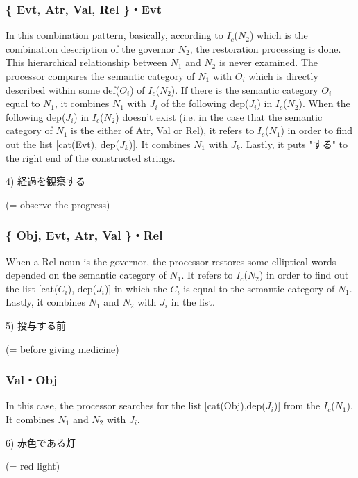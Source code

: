 \subsubsection{\{ Evt, Atr, Val, Rel \}・Evt}
 In this combination pattern, basically, according to $I_c$($N_2$)
which is the combination description of the governor $N_2$, the
restoration processing is done. This hierarchical relationship between
$N_1$ and $N_2$ is never examined. The processor compares the semantic
category of $N_1$ with $O_i$ which is directly described within some
def($O_i$) of $I_c$($N_2$). If there is the semantic category $O_i$
equal to $N_1$, it combines $N_1$ with $J_i$ of the following
dep($J_i$) in $I_c$($N_2$). When the following dep($J_i$) in
$I_c$($N_2$) doesn't exist (i.e. in the case that the semantic
category of $N_1$ is the either of Atr, Val or Rel), it refers to
$I_c$($N_1$) in order to find out the list [cat(Evt), dep($J_k$)]. It
combines $N_1$ with $J_k$. Lastly, it puts "する" to the right end of the
constructed strings.
\begin{list}{}{}
\item[4)]  経過を観察する
\item (= observe the progress)
\end{list}

\subsubsection{\{ Obj, Evt, Atr, Val \}・Rel}
 When a Rel noun is the governor, the processor restores some
elliptical words depended on the semantic category of $N_1$. It refers
to $I_c$($N_2$) in order to find out the list [cat($C_i$), dep($J_i$)]
in which the $C_i$ is equal to the semantic category of $N_1$. Lastly,
it combines $N_1$ and $N_2$ with $J_i$ in the list.
\begin{list}{}{}
\item[5)] 投与する前
\item (= before giving medicine)
\end{list}

\subsubsection{Val・Obj}
 In this case, the processor searches for the list
[cat(Obj),dep($J_i$)] from the $I_c$($N_1$). It combines $N_1$ and
$N_2$ with $J_i$.
\begin{list}{}{}
\item[6)] 赤色である灯
\item (= red light)
\end{list}

